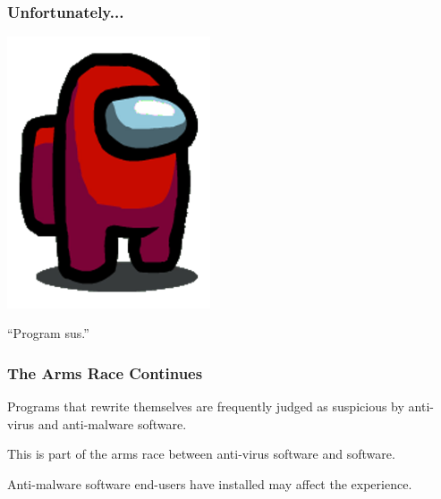 \begin{frame}
\frametitle{Unfortunately...}

\begin{center}
	\includegraphics[width=0.45\textwidth]{images/amongus.png}
\end{center}

``Program sus.''

\end{frame}

\begin{frame}
\frametitle{The Arms Race Continues}


Programs that rewrite themselves are frequently judged as suspicious by anti-virus and anti-malware software. 

This is part of the arms race between anti-virus software and software.

Anti-malware software end-users have installed may affect the experience.

\end{frame}





